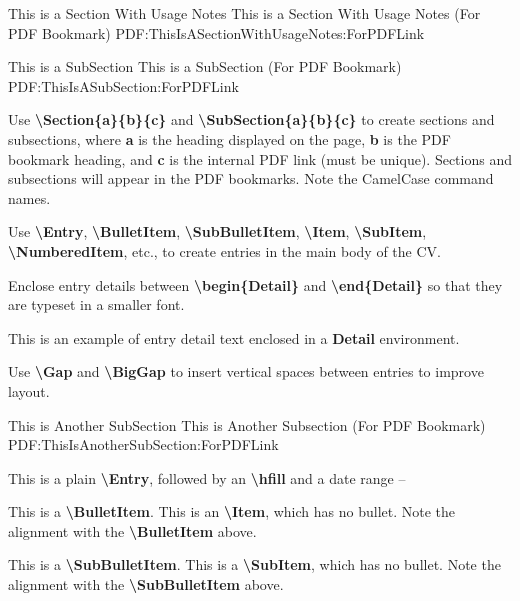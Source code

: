 \documentclass[letterpaper,MMMyyyy,nonstopmode]{simpleresumecv}
\newcommand{\Code}[1]{\mbox{\textbf{#1}}}
\newcommand{\CodeCommand}[1]{\mbox{\textbf{\textbackslash{#1}}}}
\begin{document}
\begin{Body}
	\Section
	{This is a\newline
	Section\newline
	With\newline
	Usage Notes}
	{This is a Section With Usage Notes (For PDF Bookmark)}
	{PDF:ThisIsASectionWithUsageNotes:ForPDFLink}
	
	\SubSection
	{This is a SubSection}
	{This is a SubSection (For PDF Bookmark)}
	{PDF:ThisIsASubSection:ForPDFLink}
	
	\Gap
	\BulletItem
	Use \CodeCommand{Section\{a\}\{b\}\{c\}} and
	\CodeCommand{SubSection\{a\}\{b\}\{c\}}
	to create sections and subsections, where
	\Code{a} is the heading displayed on the page,
	\Code{b} is the PDF bookmark heading, and
	\Code{c} is the internal PDF link (must be unique).
	Sections and subsections will appear in the PDF bookmarks.
	Note the CamelCase command names.
	
	\Gap
	\BulletItem
	Use
	\CodeCommand{Entry},
	\CodeCommand{BulletItem},
	\CodeCommand{SubBulletItem},
	\CodeCommand{Item},
	\CodeCommand{SubItem},
	\CodeCommand{NumberedItem},
	etc.,
	to create entries in the main body of the CV.
	
	\Gap
	\BulletItem
	Enclose entry details between
	\CodeCommand{begin\{Detail\}} and
	\CodeCommand{end\{Detail\}}
	so that they are typeset in a smaller font.
	\begin{Detail}
	\Item
	This is an example of entry detail text enclosed in a \Code{Detail} environment.
	\end{Detail}
	
	\Gap
	\BulletItem
	Use \CodeCommand{Gap} and \CodeCommand{BigGap} to insert vertical spaces between entries to improve layout.
		
	\BigGap
	\SubSection
	{This is Another SubSection}
	{This is Another Subsection (For PDF Bookmark)}
	{PDF:ThisIsAnotherSubSection:ForPDFLink}
	
	\Gap
	\Entry
	This is a plain \CodeCommand{Entry},
	followed by an \CodeCommand{hfill} and a date range
	\hfill
	 --
	
	\Gap
	\BulletItem
	This is a \CodeCommand{BulletItem}.
	\Item
	This is an \CodeCommand{Item}, which has no bullet.
	Note the alignment with the \CodeCommand{BulletItem} above.
	
	\Gap
	\SubBulletItem
	This is a \CodeCommand{SubBulletItem}.
	\SubItem
	This is a \CodeCommand{SubItem}, which has no bullet.
	Note the alignment with the \CodeCommand{SubBulletItem} above.
	

\end{Body}
\end{document}
